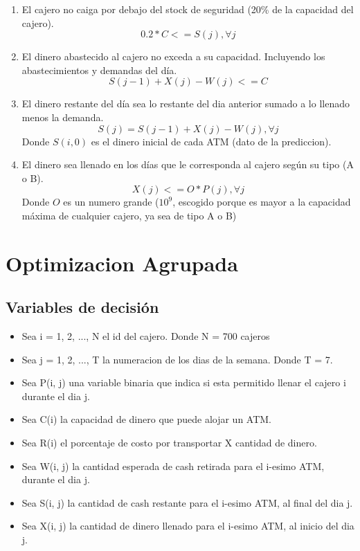 \documentclass{article}
\begin{document}
\begin{enumerate}
    \item El cajero no caiga por debajo del stock de seguridad (20\% de la capacidad del cajero).
        $$0.2 * C <= S(j) , \forall j$$
    \item El dinero abastecido al cajero no exceda a su capacidad. Incluyendo los abastecimientos y demandas del día.
        $$S(j-1) + X(j) - W(j) <= C$$
    \item El dinero restante del día sea lo restante del dia anterior sumado a lo llenado menos la demanda.
        $$S(j) = S(j-1) + X(j) - W(j) , \forall j$$
        Donde $S(i, 0)$ es el dinero inicial de cada ATM (dato de la prediccion).
    \item El dinero sea llenado en los días que le corresponda al cajero según su tipo (A o B).
        $$X(j) <= O * P(j) , \forall j$$
        Donde $O$ es un numero grande ($10^9$, escogido porque es mayor a la capacidad máxima de cualquier cajero, ya sea de tipo A o B)
\end{enumerate}



\section{Optimizacion Agrupada}

\subsection{Variables de decisión}

\begin{itemize}
    \item Sea i = 1, 2, ..., N el id del cajero. Donde N = 700 cajeros
    \item Sea j = 1, 2, ..., T la numeracion de los dias de la semana. Donde T = 7.
    \item Sea P(i, j) una variable binaria que indica si esta permitido llenar el cajero i durante el dia j.
    \item Sea C(i) la capacidad de dinero que puede alojar un ATM.
    \item Sea R(i) el porcentaje de costo por transportar X cantidad de dinero. %
    \item Sea W(i, j) la cantidad esperada de cash retirada para el i-esimo ATM, durante el dia j.
    \item Sea S(i, j) la cantidad de cash restante para el i-esimo ATM, al final del dia j.
    \item Sea X(i, j) la cantidad de dinero llenado para el i-esimo ATM, al inicio del dia j.
\end{itemize}
\end{document}
